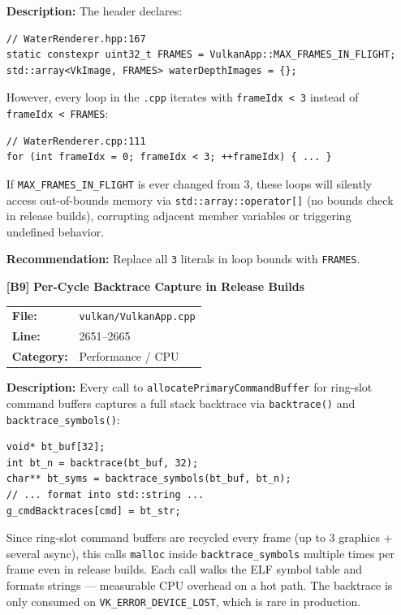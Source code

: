\documentclass[a4paper,12pt]{article}
\newcommand{\severitybox}[2]{%
  \colorbox{#1}{\makebox[2.5cm][c]{\textcolor{white}{\textbf{#2}}}}%
}
\begin{document}
\begin{enumerate}[leftmargin=*]
  \textbf{Description:}
  The header declares:
\begin{lstlisting}
// WaterRenderer.hpp:167
static constexpr uint32_t FRAMES = VulkanApp::MAX_FRAMES_IN_FLIGHT;
std::array<VkImage, FRAMES> waterDepthImages = {};
\end{lstlisting}

  However, every loop in the \texttt{.cpp} iterates with \texttt{frameIdx < 3}
  instead of \texttt{frameIdx < FRAMES}:
\begin{lstlisting}
// WaterRenderer.cpp:111
for (int frameIdx = 0; frameIdx < 3; ++frameIdx) { ... }
\end{lstlisting}

  If \texttt{MAX\_FRAMES\_IN\_FLIGHT} is ever changed from 3, these loops will
  silently access out-of-bounds memory via \texttt{std::array::operator[]}
  (no bounds check in release builds), corrupting adjacent member variables
  or triggering undefined behavior.

  \textbf{Recommendation:}
  Replace all \texttt{3} literals in loop bounds with \texttt{FRAMES}.

\item[\textbf{[B9]}] \textbf{Per-Cycle Backtrace Capture in Release Builds}
  \hfill \severitybox{highcolor}{HIGH}

  \begin{tabular}{ll}
    \textbf{File:} & \texttt{vulkan/VulkanApp.cpp} \\
    \textbf{Line:} & 2651--2665 \\
    \textbf{Category:} & Performance / CPU \\
  \end{tabular}

  \textbf{Description:}
  Every call to \texttt{allocatePrimaryCommandBuffer} for ring-slot command
  buffers captures a full stack backtrace via \texttt{backtrace()} and
  \texttt{backtrace\_symbols()}:

\begin{lstlisting}
void* bt_buf[32];
int bt_n = backtrace(bt_buf, 32);
char** bt_syms = backtrace_symbols(bt_buf, bt_n);
// ... format into std::string ...
g_cmdBacktraces[cmd] = bt_str;
\end{lstlisting}

  Since ring-slot command buffers are recycled every frame (up to 3 graphics
  + several async), this calls \texttt{malloc} inside
  \texttt{backtrace\_symbols} multiple times per frame even in release builds.
  Each call walks the ELF symbol table and formats strings — measurable CPU
  overhead on a hot path. The backtrace is only consumed on
  \texttt{VK\_ERROR\_DEVICE\_LOST}, which is rare in production.


\end{enumerate}
\end{document}
